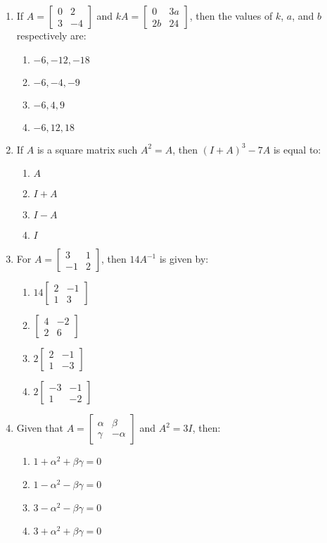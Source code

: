 \documentclass{article}
\providecommand{\myvec}[1]{\ensuremath{\begin{bmatrix}#1\end{bmatrix}}}
\begin{document}
\begin{enumerate}
    \item If $A = \myvec{0 & 2 \\ 3 & -4}$ and $kA = \myvec{0 & 3a \\ 2b & 24}$, then the values of $k$, $a$, and $b$ respectively are:
    \begin{enumerate}
        \item $-6, -12, -18$
        \item $-6, -4, -9$
        \item $-6, 4, 9$
        \item $-6, 12, 18$
    \end{enumerate}

    \item If $A$ is a square matrix such $A^2 = A$, then $(I + A)^3 - 7A$ is equal to:
    \begin{enumerate}
        \item $A$
        \item $I + A$
        \item $I - A$
        \item $I$ 
    \end{enumerate}

    \item For $A = \myvec{3 & 1 \\ -1 & 2}$, then $14A^{-1}$ is given by:
    \begin{enumerate}
        \item $14 \myvec{2 & -1 \\ 1 & 3}$
        \item $\myvec{4 & -2 \\ 2 & 6}$
        \item $2\myvec{2 & -1 \\ 1 & -3}$
        \item $2\myvec{-3 & -1 \\ 1 & -2 }$
    \end{enumerate}

    \item Given that $A = \myvec{\alpha & \beta \\ \gamma & -\alpha}$ and $A^2 = 3I$, then:
    \begin{enumerate}
        \item $1 + \alpha^2 + \beta\gamma = 0$
        \item $1 - \alpha^2 - \beta\gamma = 0$
        \item $3 - \alpha^2 - \beta\gamma = 0$
        \item $3 + \alpha^2 + \beta\gamma = 0$
    \end{enumerate}


\end{enumerate}
\end{document}
